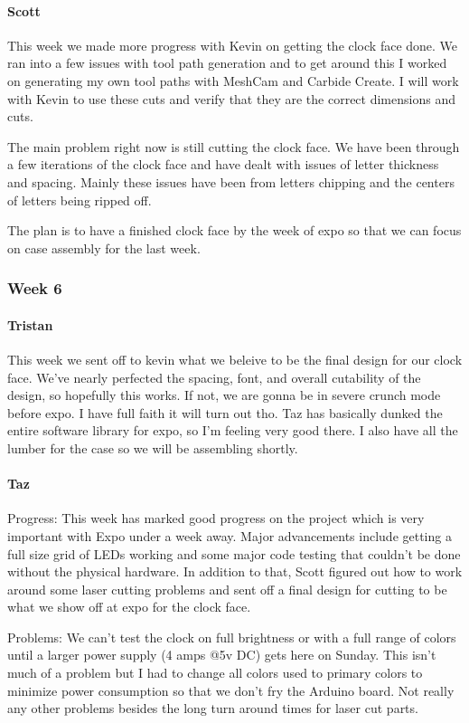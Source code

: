 \documentclass[onecolumn, draftclsnofoot,10pt, compsoc]{IEEEtran}
\begin{document}
\paragraph{Scott}
This week we made more progress with Kevin on getting the clock face done. We ran into a few issues with tool path generation and to get around this I worked on generating my own tool paths with MeshCam and Carbide Create. I will work with Kevin to use these cuts and verify that they are the correct dimensions and cuts.

The main problem right now is still cutting the clock face. We have been through a few iterations of the clock face and have dealt with issues of letter thickness and spacing. Mainly these issues have been from letters chipping and the centers of letters being ripped off.

The plan is to have a finished clock face by the week of expo so that we can focus on case assembly for the last week.
\subsubsection{Week 6}
\paragraph{Tristan}
This week we sent off to kevin what we beleive to be the final design for our clock face. We've nearly perfected the spacing, font, and overall cutability of the design, so hopefully this works. If not, we are gonna be in severe crunch mode before expo. I have full faith it will turn out tho. Taz has basically dunked the entire software library for expo, so I'm feeling very good there. I also have all the lumber for the case so we will be assembling shortly.

\paragraph{Taz}
Progress: This week has marked good progress on the project which is very important with Expo under a week away. Major advancements include getting a full size grid of LEDs working and some major code testing that couldn't be done without the physical hardware. In addition to that, Scott figured out how to work around some laser cutting problems and sent off a final design for cutting to be what we show off at expo for the clock face.

Problems: We can't test the clock on full brightness or with a full range of colors until a larger power supply (4 amps @5v DC) gets here on Sunday. This isn't much of a problem but I had to change all colors used to primary colors to minimize power consumption so that we don't fry the Arduino board. Not really any other problems besides the long turn around times for laser cut parts.
\end{document}
